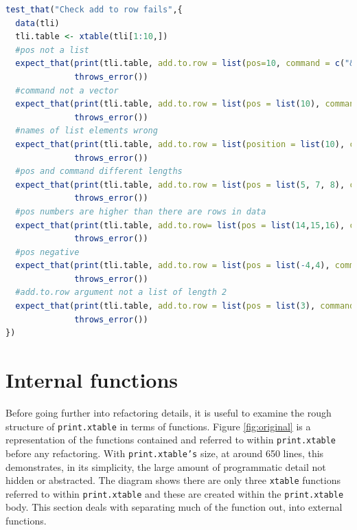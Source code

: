 \documentclass{memoir}\usepackage[]{graphicx}\usepackage[]{color}
\let\code=\texttt
\begin{document}
\begin{minipage}{\linewidth}
\begin{lstlisting}[caption={testthat addtorow test},label={lst:addtorowtest},language=R]
test_that("Check add to row fails",{
  data(tli)
  tli.table <- xtable(tli[1:10,])
  #pos not a list
  expect_that(print(tli.table, add.to.row = list(pos=10, command = c("&", "%^"))),
              throws_error())
  #command not a vector
  expect_that(print(tli.table, add.to.row = list(pos = list(10), command = list(" & "))),
              throws_error())
  #names of list elements wrong
  expect_that(print(tli.table, add.to.row = list(position = list(10), com = c(" & "))),
              throws_error())
  #pos and command different lengths
  expect_that(print(tli.table, add.to.row = list(pos = list(5, 7, 8), command = c(" & "))),
              throws_error())
  #pos numbers are higher than there are rows in data
  expect_that(print(tli.table, add.to.row= list(pos = list(14,15,16), command = c("%","#","^"))),
              throws_error())
  #pos negative
  expect_that(print(tli.table, add.to.row = list(pos = list(-4,4), command = c(" % ", "&"))),
              throws_error())
  #add.to.row argument not a list of length 2
  expect_that(print(tli.table, add.to.row = list(pos = list(3), command = c("&"), hline="s")),
              throws_error())
})
\end{lstlisting}
\end{minipage}


\section{Internal functions}


Before going further into refactoring details, it is useful to examine the rough structure of \code{print.xtable} in terms of functions. Figure \ref{fig:original} is a representation of the functions contained and referred to within \code{print.xtable} before any refactoring. With \code{print.xtable's} size, at around 650 lines, this demonstrates, in its simplicity, the large amount of programmatic detail not hidden or abstracted. The diagram shows there are only three \code{xtable} functions referred to within \code{print.xtable} and these are created within the \code{print.xtable} body. This section deals with separating much of the function out, into external functions. 
\end{document}
